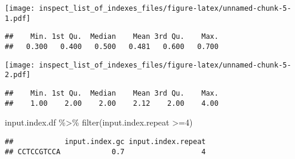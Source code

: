 \documentclass[
]{article}
\newenvironment{Shaded}{\begin{snugshade}}{\end{snugshade}}
\newcommand{\DecValTok}[1]{\textcolor[rgb]{0.00,0.00,0.81}{#1}}
\newcommand{\FunctionTok}[1]{\textcolor[rgb]{0.00,0.00,0.00}{#1}}
\newcommand{\NormalTok}[1]{#1}
\newcommand{\SpecialCharTok}[1]{\textcolor[rgb]{0.00,0.00,0.00}{#1}}
\begin{document}
\texttt{[image: inspect\_list\_of\_indexes\_files/figure-latex/unnamed-chunk-5-1.pdf]}

\begin{Shaded}
\end{Shaded}

\begin{verbatim}
##    Min. 1st Qu.  Median    Mean 3rd Qu.    Max. 
##   0.300   0.400   0.500   0.481   0.600   0.700
\end{verbatim}

\begin{Shaded}
\end{Shaded}

\texttt{[image: inspect\_list\_of\_indexes\_files/figure-latex/unnamed-chunk-5-2.pdf]}

\begin{Shaded}
\end{Shaded}

\begin{verbatim}
##    Min. 1st Qu.  Median    Mean 3rd Qu.    Max. 
##    1.00    2.00    2.00    2.12    2.00    4.00
\end{verbatim}

\begin{Shaded}
\begin{Highlighting}[]
\NormalTok{input.index.df }\SpecialCharTok{\%\textgreater{}\%} \FunctionTok{filter}\NormalTok{(input.index.repeat }\SpecialCharTok{\textgreater{}=}\DecValTok{4}\NormalTok{)}
\end{Highlighting}
\end{Shaded}

\begin{verbatim}
##            input.index.gc input.index.repeat
## CCTCCGTCCA            0.7                  4
\end{verbatim}
\end{document}
